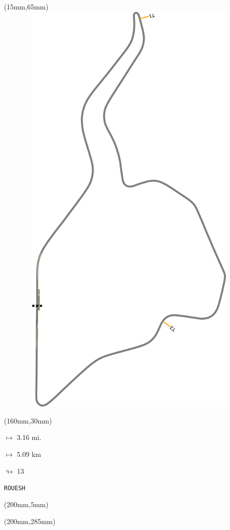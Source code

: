 \begin{textblock*}{185mm}(15mm,65mm)%
\centering
\mbox{\includegraphics[width=185mm,height=210mm,keepaspectratio]{PT/ROUESH.pdf}}
\end{textblock*}
\begin{textblock*}{40mm}(160mm,30mm)%
\Large
\par$\mapsto$ 3.16 mi.
\par$\mapsto$ 5.09 km
\par$\looparrowright$ 13
\par\hfill\tiny\tt ROUESH\\
\end{textblock*}
\begin{textblock*}{20mm}(200mm,5mm)%
\fbox{\thepage}
\label{ROUESH}
\end{textblock*}
\begin{textblock*}{20mm}(200mm,285mm)%
\fbox{\thepage}
\end{textblock*}

